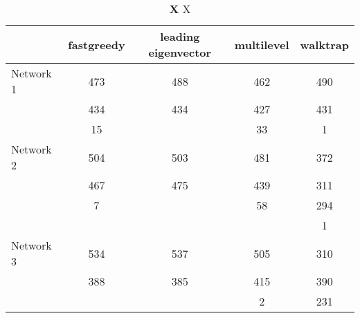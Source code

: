 \begin{table}[htbp]
\centering
\caption[X]{\textbf{X} X\\
}
\label{tab:algos4}

\begin{tabular}{lcccc}
\toprule
	 {} &
	 fastgreedy &
	 leading eigenvector &
	 multilevel &
	 walktrap \\ \midrule
	 
	  Network 1
	  & 473 & 488 & 462 & 490 \\
	  & 434 & 434 & 427 & 431 \\
	  & 15 &   & 33 & 1 \\ \midrule
	  Network 2
	  & 504 & 503 & 481 & 372 \\
	  & 467 & 475 & 439 & 311 \\
	  & 7 &   &  58 & 294 \\
	  & & & & 1 \\ \midrule
	  Network 3
	  & 534 & 537 & 505 & 310 \\
	  & 388 & 385 & 415 & 390 \\
	  &  &   &  2 & 231 \\
	 \bottomrule
	 
\end{tabular}

\end{table}

